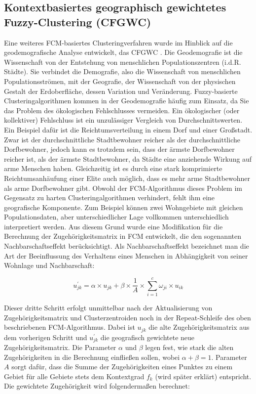 \documentclass[11pt,ceqn]{book}
\begin{document}
\subsection{Kontextbasiertes geographisch gewichtetes Fuzzy-Clustering (CFGWC)}
Eine weiteres FCM-basiertes Clusteringverfahren wurde im Hinblick auf die geodemografische Analyse entwickelt, das CFGWC \cite{cfgwc}. Die Geodemografie ist die Wissenschaft von der Entstehung von menschlichen Populationszentren (i.d.R. Städte). Sie verbindet die Demografie, also die Wissenschaft von menschlichen Populationsströmen, mit der Geografie, der Wissenschaft von der physischen Gestalt der Erdoberfläche, dessen Variation und Veränderung. Fuzzy-basierte Clusteringalgorithmen kommen in der Geodemografie häufig zum Einsatz, da Sie das Problem des ökologischen Fehlschlusses vermeiden. Ein ökologischer (oder kollektiver) Fehlschluss ist ein unzulässiger Vergleich von Durchschnittswerten.
Ein Beispiel dafür ist die Reichtumsverteilung in einem Dorf und einer Großstadt. Zwar ist der durchschnittliche Stadtbewohner reicher als der durchschnittliche Dorfbewohner, jedoch kann es trotzdem sein, dass der ärmste Dorfbewohner reicher ist, als der ärmste Stadtbewohner, da Städte eine anziehende Wirkung auf arme Menschen haben. Gleichzeitig ist es durch eine stark komprimierte Reichtumsanhäufung einer Elite auch möglich, dass es mehr arme Stadtbewohner als arme Dorfbewohner gibt.
Obwohl der FCM-Algorithmus dieses Problem im Gegensatz zu harten Clusteringalgorithmen verhindert, fehlt ihm eine geografische Komponente. Zum Beispiel können zwei Wohngebiete mit gleichen Populationsdaten, aber unterschiedlicher Lage vollkommen unterschiedlich interpretiert werden. Aus diesem Grund wurde eine Modifikation für die Berechnung der Zugehörigkeitsmatrix in FCM entwickelt, die den sogenannten Nachbarschaftseffekt berücksichtigt. Als Nachbarschaftseffekt bezeichnet man die Art der Beeinflussung des Verhaltens eines Menschen in Abhängigkeit von seiner Wohnlage und Nachbarschaft:

$$u_{jk}^{\prime} = \alpha \times u_{jk}+\beta \times \frac{1}{A} \times \sum\limits_{i=1}^c \omega_{ji} \times u _{ik}$$

Dieser dritte Schritt erfolgt unmittelbar nach der Aktualisierung von Zugehörigkeitsmatrix und Clusterzentroiden noch in der Repeat-Schleife des oben beschriebenen FCM-Algorithmus. Dabei ist $u_{jk}$ die alte Zugehörigkeitsmatrix aus dem vorherigen Schritt und $u_{jk}^{\prime}$ die geografisch gewichtete neue Zugehörigkeitsmatrix. Die Parameter $\alpha$ und $\beta$ legen fest, wie stark die alten Zugehörigkeiten in die Berechnung einfließen sollen, wobei $\alpha + \beta = 1$. Parameter $A$ sorgt dafür, dass die Summe der Zugehörigkeiten eines Punktes zu einem Gebiet für alle Gebiete stets dem Kontextgrad $f_k$ (wird später erklärt) entspricht. Die gewichtete Zugehörigkeit wird folgendermaßen berechnet:
\end{document}
